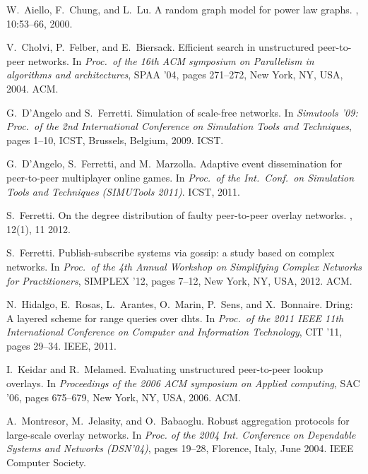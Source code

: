 \documentclass{sig-alternate}
\begin{document}
\begin{thebibliography}{10}

W.~Aiello, F.~Chung, and L.~Lu.
\newblock A random graph model for power law graphs.
, 10:53--66, 2000.

V.~Cholvi, P.~Felber, and E.~Biersack.
\newblock Efficient search in unstructured peer-to-peer networks.
\newblock In {\em Proc.~of the 16th ACM symposium on Parallelism in algorithms
  and architectures}, SPAA '04, pages 271--272, New York, NY, USA, 2004. ACM.

G.~D'Angelo and S.~Ferretti.
\newblock Simulation of scale-free networks.
\newblock In {\em Simutools '09: Proc.~of the 2nd International Conference on
  Simulation Tools and Techniques}, pages 1--10, ICST, Brussels, Belgium, 2009.
  ICST.

G.~D'Angelo, S.~Ferretti, and M.~Marzolla.
\newblock Adaptive event dissemination for peer-to-peer multiplayer online
  games.
\newblock In {\em Proc.~of the Int.~Conf.~on Simulation Tools and Techniques
  (SIMUTools 2011)}. ICST, 2011.

S.~Ferretti.
\newblock On the degree distribution of faulty peer-to-peer overlay networks.
, 12(1), 11 2012.

S.~Ferretti.
\newblock Publish-subscribe systems via gossip: a study based on complex
  networks.
\newblock In {\em Proc.~of the 4th Annual Workshop on Simplifying Complex
  Networks for Practitioners}, SIMPLEX '12, pages 7--12, New York, NY, USA,
  2012. ACM.

N.~Hidalgo, E.~Rosas, L.~Arantes, O.~Marin, P.~Sens, and X.~Bonnaire.
\newblock Dring: A layered scheme for range queries over dhts.
\newblock In {\em Proc.~of the 2011 IEEE 11th International Conference on
  Computer and Information Technology}, CIT '11, pages 29--34. IEEE, 2011.

I.~Keidar and R.~Melamed.
\newblock Evaluating unstructured peer-to-peer lookup overlays.
\newblock In {\em Proceedings of the 2006 ACM symposium on Applied computing},
  SAC '06, pages 675--679, New York, NY, USA, 2006. ACM.

A.~Montresor, M.~Jelasity, and O.~Babaoglu.
\newblock Robust aggregation protocols for large-scale overlay networks.
\newblock In {\em Proc. of the 2004 Int. Conference on Dependable Systems and
  Networks (DSN'04)}, pages 19--28, Florence, Italy, June 2004. IEEE Computer
  Society.


\end{thebibliography}
\end{document}
